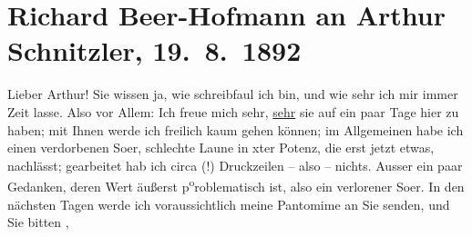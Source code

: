 

         
         \renewcommand{\erwaehntePersonen}{Personen:  ?? [Schreibkraft für Arthur Schnitzler], Richard Beer-Hofmann, Bertha Flegmann, Hugo von Hofmannsthal, Karl Kraus, Felix Salten, Gustav Schwarzkopf}
         \renewcommand{\erwaehnteOrte}{Orte: Bad Ischl, Wien}
         \renewcommand{\erwaehnteWerke}{Werke: Abschiedssouper, Anatols Hochzeitsmorgen, Anfang vom Ende, Das Märchen. Schauspiel in drei Aufzügen, Deutsche Dichtung, Die Frage an das Schicksal, Episode, Pierrot Hypnotiseur}
               \section[Richard Beer-Hofmann an Arthur Schnitzler, 19. 8. 1892]{ Richard Beer-Hofmann an Arthur Schnitzler, 19. 8. 1892}\nopagebreak{}\rehead{ }\begin{ledgroupsized}[t]{13cm}\normalsize\beginnumbering{} \toendnotes[C]{\smallbreak\pagebreak[2]} 
\toendnotes[C]{\smallbreak}\pstart
           \noindent{}{\pb}Lieber Arthur! Sie wissen ja, wie schreibfaul ich bin, und wie sehr
               ich mir immer Zeit lasse.\pend
           \pstart
           Also vor Allem: Ich freue mich sehr, \uline{sehr} sie auf ein
               paar Tage hier zu haben; mit Ihnen {\pb}werde ich freilich kaum gehen können; im Allgemeinen habe ich einen verdorbenen
                  So{\geminationm}er, schlechte Laune in xter Potenz, die erst jetzt
               etwas, nachlässt; gearbeitet {\pb}hab
               ich circa  (!) Druckzeilen – also – nichts. Ausser
               ein paar Gedanken, deren Wert äußerst p\substVorne{}\textsuperscript{o}\substDazwischen{}ro\substHinten{}blematisch ist, also ein verlorener So{\geminationm}er. In
               den nächsten {\pb}Tagen werde ich
               voraussichtlich meine Pantomime an Sie senden, und Sie bitten ,

\end{ledgroupsized}
